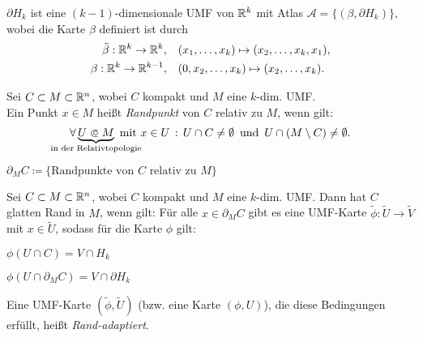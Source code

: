 \documentclass{cheat-sheet}
\newcommand{\Atlas}{\mathcal{A}} %
\theoremstyle{definition}
\begin{document}
\begin{beob}
  $\partial H_k$ ist eine $(k{-}1)$-dimensionale UMF von $\mathbb{R}^k$ mit Atlas $\Atlas = \{ (\beta, \partial H_k) \}$, wobei die Karte $\beta$ definiert ist durch
  \begin{align*}
    \tilde{\beta} : \mathbb{R}^k \to \mathbb{R}^k, \quad &(x_1, \ldots, x_k) \mapsto (x_2, \ldots, x_k, x_1), \\
    \beta : \mathbb{R}^k \to \mathbb{R}^{k-1}, \quad &(0, x_2, \ldots, x_k) \mapsto (x_2, \ldots, x_k).
  \end{align*}
\end{beob}


\begin{defn}
  Sei $C \subset M \subset \mathbb{R}^n$, wobei $C$ kompakt und $M$ eine $k$-dim. UMF.\\
  Ein Punkt $x \in M$ heißt \emph{Randpunkt} von $C$ relativ zu $M$, wenn gilt:
  \[ \fa{\underbrace{U \opn M}_{\mathclap{\text{in der Relativtopologie}}} \text{ mit } x \in U} U \cap C \not= \emptyset \enspace \text{und} \enspace U \cap (M \setminus C) \not= \emptyset. \]
\end{defn}


\begin{nota}
  $\partial_M C \coloneqq \{ \text{Randpunkte von $C$ relativ zu $M$} \}$
\end{nota}

\begin{defn}
  Sei $C \subset M \subset \mathbb{R}^n$, wobei $C$ kompakt und $M$ eine $k$-dim. UMF.
  Dann hat $C$ glatten Rand in $M$, wenn gilt: Für alle $x \in \partial_M C$ gibt es eine UMF-Karte $\widetilde{\phi} : \widetilde{U} \to \widetilde{V}$ mit $x \in \widetilde{U}$, sodass für die Karte $\phi$ gilt:
  \begin{itemize}
    \begin{multicols}{2}
      \item $\phi(U \cap C) = V \cap H_k$
      \item $\phi(U \cap \partial_M C) = V \cap \partial H_k$
    \end{multicols}
  \end{itemize}
\end{defn}

\begin{defn}
  Eine UMF-Karte $(\widetilde{\phi}, \widetilde{U})$ (bzw. eine Karte $(\phi, U)$), die diese Bedingungen erfüllt, heißt \emph{Rand-adaptiert}.
\end{defn}
\end{document}
